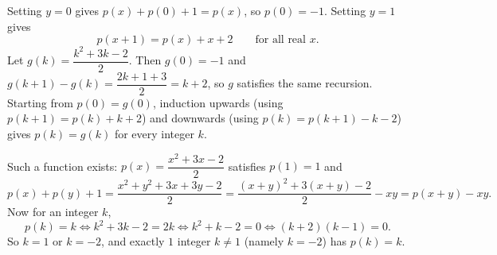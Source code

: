 Setting $y=0$ gives $p(x)+p(0)+1=p(x)$, so $p(0)=-1$. Setting $y=1$ gives
\[p(x+1)=p(x)+x+2\qquad\text{for all real }x.\]
Let $g(k)=\dfrac{k^2+3k-2}{2}$. Then $g(0)=-1$ and $g(k+1)-g(k)=\dfrac{2k+1+3}{2}=k+2$, so $g$ satisfies the same recursion. Starting from $p(0)=g(0)$, induction upwards (using $p(k+1)=p(k)+k+2$) and downwards (using $p(k)=p(k+1)-k-2$) gives $p(k)=g(k)$ for every integer $k$.

Such a function exists: $p(x)=\dfrac{x^2+3x-2}2$ satisfies $p(1)=1$ and
\[p(x)+p(y)+1=\dfrac{x^2+y^2+3x+3y-2}2=\dfrac{(x+y)^2+3(x+y)-2}2-xy=p(x+y)-xy.\]
Now for an integer $k$,
\[p(k)=k\iff k^2+3k-2=2k\iff k^2+k-2=0\iff(k+2)(k-1)=0.\]
So $k=1$ or $k=-2$, and exactly $\boxed{1}$ integer $k\ne1$ (namely $k=-2$) has $p(k)=k$.
